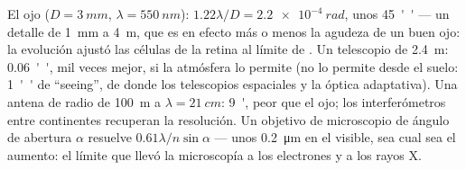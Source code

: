 \begin{example}\label{ex:b2:diffraction:instruments}
El ojo ($D = \qty{3}{mm}$, $\lambda = \qty{550}{nm}$): $1.22\lambda/D = \qty{2.2e-4}{rad}$, unos
\qty{45}{''} --- un detalle de \qty{1}{mm} a \qty{4}{m}, que es en efecto más o menos la
agudeza de un buen ojo: la evolución ajustó las células de la retina al
límite de . Un telescopio de \qty{2.4}{m}: \qty{0.06}{''}, mil veces
mejor, si la atmósfera lo permite (no lo permite desde el suelo:
\qty{1}{''} de ``seeing'', de donde los telescopios espaciales y la óptica adaptativa). Una
antena de radio de \qty{100}{m} a $\lambda = \qty{21}{cm}$: \qty{9}{'}, peor que el ojo;
los interferómetros entre continentes recuperan la resolución. Un
objetivo de microscopio de ángulo de abertura $\alpha$ resuelve $0.61\lambda/n\sin\alpha$
--- unos \qty{0.2}{\micro m} en el visible, sea cual sea el aumento: el
límite que llevó la microscopía a los electrones y a los rayos X.
\end{example}


